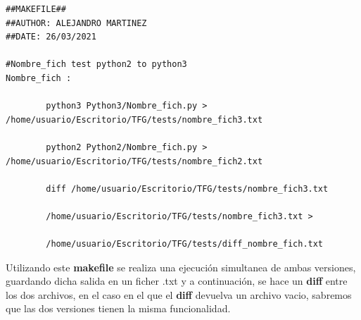 \documentclass{cosas/tfg_domingo}
\begin{document}
\begin{verbatim}
##MAKEFILE##
##AUTHOR: ALEJANDRO MARTINEZ
##DATE: 26/03/2021

#Nombre_fich test python2 to python3
Nombre_fich : 

        python3 Python3/Nombre_fich.py > /home/usuario/Escritorio/TFG/tests/nombre_fich3.txt
        
        python2 Python2/Nombre_fich.py > /home/usuario/Escritorio/TFG/tests/nombre_fich2.txt
        
        diff /home/usuario/Escritorio/TFG/tests/nombre_fich3.txt
        
        /home/usuario/Escritorio/TFG/tests/nombre_fich3.txt >
        
        /home/usuario/Escritorio/TFG/tests/diff_nombre_fich.txt
\end{verbatim}

Utilizando este \textbf{makefile} se realiza una ejecución simultanea de ambas versiones, guardando dicha salida en un ficher .txt y a continuación, se hace un \textbf{diff} entre los dos archivos, en el caso en el que el \textbf{diff} devuelva un archivo vacio, sabremos que las dos versiones tienen la misma funcionalidad.


\end{document}
